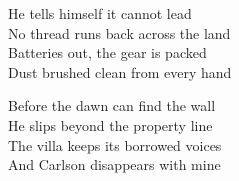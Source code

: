 \begin{lyrics}
He tells himself it cannot lead\\
No thread runs back across the land\\
Batteries out, the gear is packed\\
Dust brushed clean from every hand

Before the dawn can find the wall\\
He slips beyond the property line\\
The villa keeps its borrowed voices\\
And Carlson disappears with mine
\end{lyrics}


